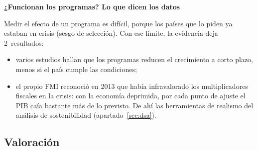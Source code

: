 \documentclass[11pt]{article}
\begin{document}
\begin{anotaciones}
\textbf{¿Funcionan los programas? Lo que dicen los datos}

Medir el efecto de un programa es difícil, porque los países que lo piden ya estaban en crisis (sesgo de selección). Con ese límite, la evidencia deja 2~resultados:
\begin{itemize}
\item varios estudios hallan que los programas reducen el crecimiento a corto plazo\nocite{PrzeworskiVreeland2000,BarroLee2005}, menos si el país cumple las condiciones\nocite{Dreher2006};
\item el propio FMI reconoció en 2013 que había infravalorado los multiplicadores fiscales en la crisis: con la economía deprimida, por cada punto de ajuste el PIB caía bastante más de lo previsto\nocite{BlanchardLeigh2013Growth}. De ahí las herramientas de realismo del análisis de sostenibilidad (apartado~\ref{sec:dsa}).
\end{itemize}
\end{anotaciones}

\subsection{Valoración}\label{sec:valoracion}
\end{document}
